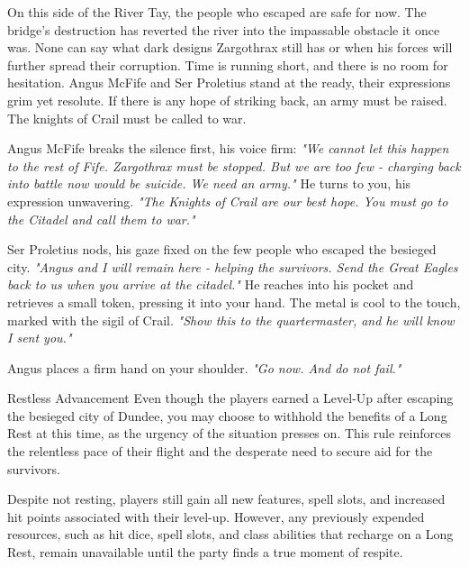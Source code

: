 	{}%
	{}%
	{}%
	{}%
	{}%
	{}%
	{}%
	{}%
	

{\entryfont On this side of the River Tay, the people who escaped are safe for now. The bridge's destruction has reverted the river into the impassable obstacle it once was. None can say what dark designs Zargothrax still has or when his forces will further spread their corruption. Time is running short, and there is no room for hesitation. Angus McFife and Ser Proletius stand at the ready, their expressions grim yet resolute. If there is any hope of striking back, an army must be raised. The knights of Crail must be called to war.}

\begin{DndReadAloud}
	Angus McFife breaks the silence first, his voice firm: \textit{"We cannot let this happen to the rest of Fife. Zargothrax must be stopped. But we are too few - charging back into battle now would be suicide. We need an army."} He turns to you, his expression unwavering. \textit{"The Knights of Crail are our best hope. You must go to the Citadel and call them to war."}

Ser Proletius nods, his gaze fixed on the few people who escaped the besieged city. \textit{"Angus and I will remain here - helping the survivors. Send the Great Eagles back to us when you arrive at the citadel."} He reaches into his pocket and retrieves a small token, pressing it into your hand. The metal is cool to the touch, marked with the sigil of Crail. \textit{"Show this to the quartermaster, and he will know I sent you."}

	Angus places a firm hand on your shoulder. \textit{"Go now. And do not fail."}
\end{DndReadAloud}

\begin{DndOptionalRule}{Restless Advancement}\label{or:RestlessAdvancement}%
	Even though the players earned a Level-Up after escaping the besieged city of Dundee, you may choose to withhold the benefits of a Long Rest at this time, as the urgency of the situation presses on. This rule reinforces the relentless pace of their flight and the desperate need to secure aid for the survivors.

	Despite not resting, players still gain all new features, spell slots, and increased hit points associated with their level-up. However, any previously expended resources, such as hit dice, spell slots, and class abilities that recharge on a Long Rest, remain unavailable until the party finds a true moment of respite.
\end{DndOptionalRule}


